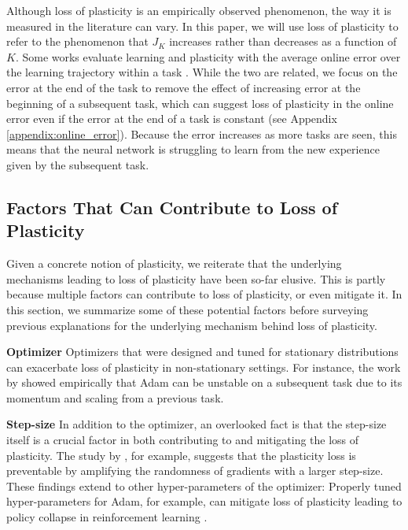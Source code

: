 \documentclass{article}
\begin{document}
Although loss of plasticity is an empirically observed phenomenon, the way it is measured in the literature can vary.
In this paper, we will use loss of plasticity to refer to the phenomenon that $J_{K}$ increases rather than decreases as a function of $K$.
Some works evaluate learning and plasticity with the average online error over the learning trajectory within a task \citep{elsayed23_utilit_pertur_gradien_descen,dohare23_maint_plast_deep_contin_learn,kumar23_maint_plast_regen_regul}.
While the two are related, we focus on the error at the end of the task to remove the effect of increasing error at the beginning of a subsequent task, which can suggest loss of plasticity in the online error even if the error at the end of a task is constant (see Appendix \ref{appendix:online_error}).
Because the error increases as more tasks are seen, this means that the neural network is struggling to learn from the new experience given by the subsequent task.

\subsection{Factors That Can Contribute to Loss of Plasticity}
\vspace{-2mm}

Given a concrete notion of plasticity,
we reiterate that the underlying mechanisms leading to loss of plasticity have been so-far elusive.
This is partly because multiple factors can contribute to loss of plasticity, or even mitigate it.
In this section, we summarize some of these potential factors before surveying previous explanations for the underlying mechanism behind loss of plasticity.

  \textbf{Optimizer}\hspace{2mm}
        Optimizers that were designed and tuned for stationary distributions can exacerbate loss of plasticity in non-stationary settings.
        For instance, the work by \cite{lyle23_under} showed empirically that Adam \citep{kingma14_adam} can be unstable on a subsequent task due to its momentum and scaling from a previous task.

  \textbf{Step-size}\hspace{2mm}
        In addition to the optimizer, an overlooked fact is that the step-size itself is a crucial factor in both contributing to and mitigating the loss of plasticity.
        The study by \cite{berariu2021study}, for example, suggests that the plasticity loss is preventable by amplifying the randomness of gradients with a larger step-size.
        These findings extend to other hyper-parameters of the optimizer: Properly tuned hyper-parameters for Adam, for example, can mitigate loss of plasticity leading to policy collapse in reinforcement learning \citep{dohare23_overc_polic_collap_deep_reinf_learn,lyle23_under}.
\end{document}
